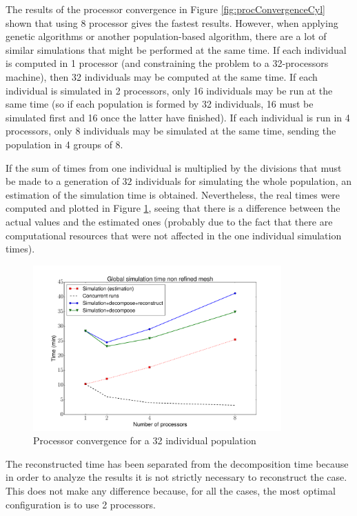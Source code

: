 \newpage

The results of the processor convergence in Figure \ref{fig:procConvergenceCyl} shown that using $8$ processor gives the fastest results. However, when applying genetic algorithms or another population-based algorithm, there are a lot of similar simulations that might be performed at the same time. If each individual is computed in 1 processor (and constraining the problem to a 32-processors machine), then 32 individuals may be computed at the same time. If each individual is simulated in 2 processors, only 16 individuals may be run at the same time (so if each population is formed by 32 individuals, 16 must be simulated first and 16 once the latter have finished). If each individual is run in 4 processors, only 8 individuals may be simulated at the same time, sending the population in 4 groups of 8. 


If the sum of times from one individual is multiplied by the divisions that must be made to a generation of $32$ individuals for simulating the whole population, an estimation of the simulation time is obtained. Nevertheless, the real times were computed and plotted in Figure \ref{fig:genProcConvergenceCyl}, seeing that there is a difference between the actual values and the estimated ones (probably due to the fact that there are computational resources that were not affected in the one individual simulation times).  

     \begin{figure}[h!]
        \centering
        \includegraphics[width=0.85\textwidth]{Figures/3/procConv_1gen2.pdf}
        \caption{Processor convergence for a 32 individual population}
        \label{fig:genProcConvergenceCyl}
    \end{figure}

The reconstructed time has been separated from the decomposition time because in order to analyze the results it is not strictly necessary to reconstruct the case. This does not make any difference because, for all the cases, the most optimal configuration is to use 2 processors. 

